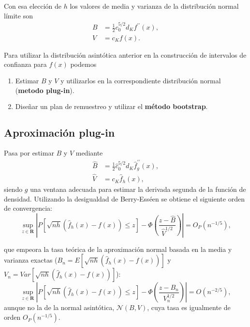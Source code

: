 \documentclass[]{book}
\theoremstyle{break}
\theoremstyle{definition}
\theoremstyle{definition}
\theoremstyle{definition}
\theoremstyle{remark}
\begin{document}
Con esa elección de \(h\) los valores de media y varianza de la
distribución normal límite son\[\begin{aligned}
B &= \frac{1}{2}c_{0}^{5/2}d_{K}f^{\prime \prime }\left( x \right), \\
V &= c_{K}f\left( x \right).\end{aligned}\]

Para utilizar la distribución asintótica anterior en la construcción de
intervalos de confianza para \(f\left( x \right)\) podemos

\begin{enumerate}
\def\labelenumi{\arabic{enumi}.}
\item
  Estimar \(B\) y \(V\) y utilizarlos en la correspondiente distribución
  normal (\textbf{metodo plug-in}).
\item
  Diseñar un plan de remuestreo y utilizar el \textbf{método bootstrap}.
\end{enumerate}

\subsection{Aproximación plug-in}\label{aproximaciuxf3n-plug-in}

Pasa por estimar \(B\) y \(V\) mediante\[\begin{aligned}
\hat{B} &= \frac{1}{2}\hat{c}_{0}^{5/2}d_{K}\hat{f}_{g}^{\prime \prime
}\left( x \right), \\
\hat{V} &= c_{K}\hat{f}_{h}\left( x \right),\end{aligned}\]siendo \(g\)
una ventana adecuada para estimar la derivada segunda de la función de
densidad. Utilizando la desigualdad de Berry-Esséen se obtiene el
siguiente orden de
convergencia:\[\sup_{z\in \boldsymbol{R}}\left\vert P\left[ \sqrt{nh}\left( \hat{f}
_{h}\left( x \right) -f\left( x \right) \right) \leq z\right] -\Phi \left( 
\frac{z-\hat{B}}{\hat{V}^{1/2}} \right) \right\vert =O_{P}\left(
n^{-1/5} \right),\]

que empeora la tasa teórica de la aproximación normal basada en la media
y varianza exactas
(\(B_n=E\left[ \sqrt{nh}\left( \hat{f}_{h}\left( x \right) -f\left( x \right) \right) \right]\)
y
\(V_n=Var\left[ \sqrt{nh} \left( \hat{f}_{h}\left( x \right) -f\left( x \right) \right) \right]\)):
\[\sup_{z\in \boldsymbol{R}}\left\vert P\left[ \sqrt{nh}\left( \hat{f}
_{h}\left( x \right) -f\left( x \right) \right) \leq z\right] -\Phi \left( 
\frac{z-B_n}{V_n^{1/2}} \right) \right\vert =O\left( n^{-2/5} \right),\]
aunque no la de la normal asintótica, \(\mathcal{N}\left( B,V \right)\),
cuya tasa es igualmente de orden \(O_{P}\left( n^{-1/5} \right)\).
\end{document}
